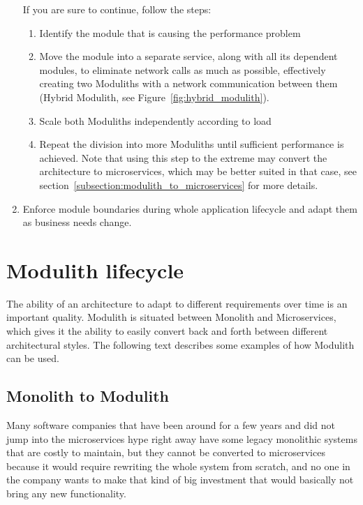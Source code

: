 \begin{enumerate}
          If you are sure to continue, follow the steps:
          \begin{enumerate}
              \item Identify the module that is causing the performance problem
              \item Move the module into a separate service, along with all its dependent modules, to eliminate network calls as much as possible, effectively creating two Moduliths with a network communication between them (Hybrid Modulith, see Figure~\ref{fig:hybrid_modulith}).
              \item Scale both Moduliths independently according to load
              \item Repeat the division into more Moduliths until sufficient performance is achieved. Note that using this step to the extreme may convert the architecture to microservices, which may be better suited in that case, see section~\ref{subsection:modulith_to_microservices} for more details.
          \end{enumerate}
    \item Enforce module boundaries during whole application lifecycle and adapt them as business needs change.
\end{enumerate}


\section{Modulith lifecycle}
The ability of an architecture to adapt to different requirements over time is an important quality. Modulith is situated between Monolith and Microservices, which gives it the ability to easily convert back and forth between different architectural styles. The following text describes some examples of how Modulith can be used.

\subsection{Monolith to Modulith}
\label{subsection:monolith_to_modulith}
Many software companies that have been around for a few years and did not jump into the microservices hype right away have some legacy monolithic systems that are costly to maintain, but they cannot be converted to microservices because it would require rewriting the whole system from scratch, and no one in the company wants to make that kind of big investment that would basically not bring any new functionality.

